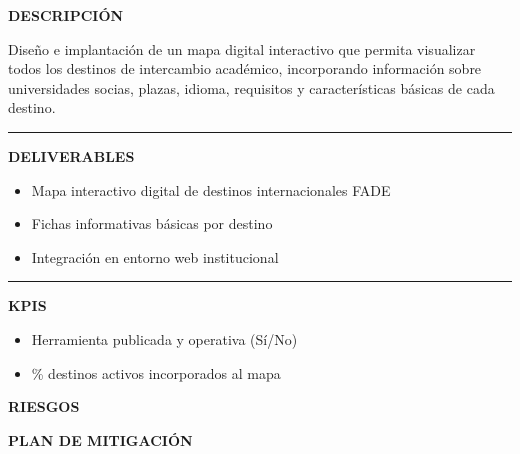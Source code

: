 \documentclass[11pt,a4paper]{scrreprt}
\newcommand{\fieldlabel}[1]{%
  {\footnotesize\sffamily\bfseries\color{mutedcolor}\MakeUppercase{#1}}\par\nopagebreak[4]
}
\newcommand{\fieldsep}{\vspace{3pt}\noindent\textcolor{bordercolor}{\rule{\linewidth}{0.4pt}}\vspace{3pt}\par}
\begin{document}
\begin{tcolorbox}[pabox={fgcolor}{PA1.1 \enspace\textbullet\enspace Elaboración de un mapa interactivo con los destinos disponibles}]

\fieldlabel{Descripci\'on}
{\small Diseño e implantación de un mapa digital interactivo que permita visualizar todos los destinos de intercambio académico, incorporando información sobre universidades socias, plazas, idioma, requisitos y características básicas de cada destino.}\par
\fieldsep
\fieldlabel{Deliverables}
{\small \begin{itemize}[noitemsep,topsep=2pt]
\item Mapa interactivo digital de destinos internacionales FADE
\item Fichas informativas básicas por destino
\item Integración en entorno web institucional
\end{itemize}}\par
\fieldsep
\fieldlabel{KPIs}
{\small \begin{itemize}[noitemsep,topsep=2pt]
\item Herramienta publicada y operativa (Sí/No)
\item \% destinos activos incorporados al mapa
\end{itemize}}\par
\end{tcolorbox}
\begin{tcolorbox}[riskbox]
{\footnotesize\sffamily\bfseries\color{red!50!black} RIESGOS}\par{}
\end{tcolorbox}
\begin{tcolorbox}[mitbox]
{\footnotesize\sffamily\bfseries\color{green!40!black} PLAN DE MITIGACI\'ON}\par{}
\end{tcolorbox}
\vspace{8pt}
\end{document}

